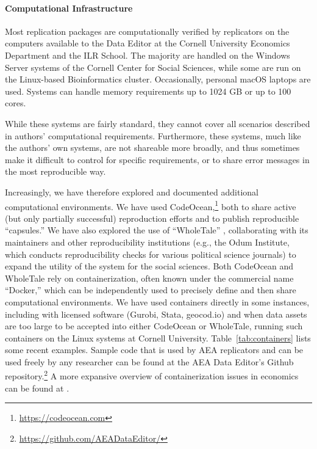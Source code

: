 \documentclass[PP]{AEA}
\newcommand{\purlcite}[2]{#2.\footnote{\url{#1}}}
\newcommand{\curlcite}[2]{#2,\footnote{\url{#1}}}
\begin{document}
\paragraph{Computational Infrastructure}

Most replication packages are computationally verified by replicators on the computers available to the Data Editor at the Cornell University Economics Department and the ILR School. The majority are handled on the Windows Server systems of the Cornell Center for Social Sciences, while some are run on the Linux-based Bioinformatics cluster. Occasionally, personal macOS laptops are used. Systems can handle memory requirements up to 1024 GB or up to 100 cores. 

While these systems are fairly standard, they cannot cover all scenarios described in authors' computational requirements. Furthermore, these systems, much like the authors' own systems, are not shareable more broadly, and thus sometimes make it difficult to control for specific requirements, or to share error messages in the most reproducible way.  

Increasingly, we have therefore explored and documented additional computational environments. We have used \curlcite{https://codeocean.com}{CodeOcean} \citep{clyburne-sherin2019} both to share active (but only partially successful) reproduction efforts and to publish reproducible ``capsules.'' We have also explored the use of ``WholeTale'' \citep{chard2020a}, collaborating with its maintainers and other reproducibility institutions (e.g., the Odum Institute, which conducts reproducibility checks for various political science journals) to expand the utility of the system for the social sciences. Both {{CodeOcean}} and WholeTale rely on containerization, often known under the commercial name ``Docker,'' which can be independently used to precisely define and then share computational environments. We have used containers directly in some instances, including with licensed software (Gurobi, Stata, geocod.io) and when data assets are too large to be accepted into either CodeOcean or WholeTale, running such containers on the Linux systems at Cornell University. Table~\ref{tab:containers} lists some recent examples. Sample code that is used by AEA replicators and can be used freely by any researcher can be found at the \purlcite{https://github.com/AEADataEditor/}{AEA Data Editor's Github repository} A more expansive overview of containerization issues in economics can be found at \citet{aeadataeditor2021}. 
\end{document}
